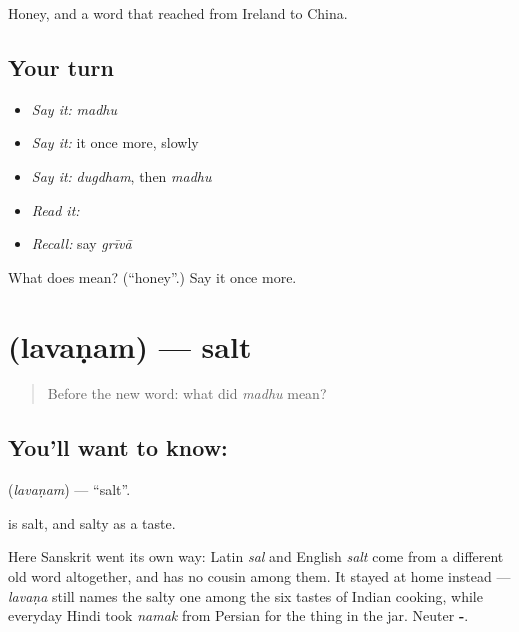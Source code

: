 \begin{grammarlens}[title={What you've built}]
Honey, and a word that reached from Ireland to China.
\end{grammarlens}

\subsection*{Your turn}
\begin{itemize}
\raggedright
  \item \emph{Say it:} \emph{madhu}
  \item \emph{Say it:} it once more, slowly
  \item \emph{Say it:} \emph{dugdham}, then \emph{madhu}
  \item \emph{Read it:} \textbf{}
  \item \emph{Recall:} say \emph{grīvā}
\end{itemize}

\begin{tcolorbox}[breakable,colback=teal!4,colframe=teal!35!black,title={Before you move on}]
What does  mean? (\textquotedblleft{}honey\textquotedblright{}.) Say it once more.
\end{tcolorbox}
\section[\texorpdfstring{\sk{लवणम्} (lavaṇam)}{लवणम् (lavaṇam)}]{ (lavaṇam) — salt}

\label{lesson:SA-C35-salt}



\begin{quote}
Before the new word: what did \emph{madhu} mean?
\end{quote}

\subsection*{You'll want to know: }
\textbf{} (\emph{lavaṇam}) — \textquotedblleft{}salt\textquotedblright{}.

\textbf{} is salt, and salty as a taste.

Here Sanskrit went its own way: Latin \emph{sal} and English \emph{salt} come from a different old word altogether, and \textbf{} has no cousin among them. It stayed at home instead — \emph{lavaṇa} still names the salty one among the six tastes of Indian cooking, while everyday Hindi took \emph{namak} from Persian for the thing in the jar. Neuter \textbf{-}.

